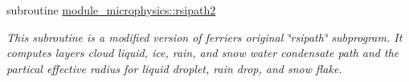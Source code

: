 {\bf }\par
\begin{DoxyCompactItemize}
\item 
subroutine \hyperlink{namespacemodule__microphysics_ac80bc526194e30c9e1a97e7833a2a77f}{module\+\_\+microphysics\+::rsipath2}                                                                                           
\begin{DoxyCompactList}\small\item\em This subroutine is a modified version of ferrier\textquotesingle{}s original \char`\"{}rsipath\char`\"{} subprogram. It computes layer\textquotesingle{}s cloud liquid, ice, rain, and snow water condensate path and the partical effective radius for liquid droplet, rain drop, and snow flake. \end{DoxyCompactList}\end{DoxyCompactItemize}

